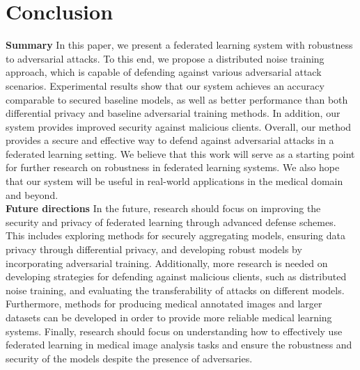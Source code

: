 \section{Conclusion }
\textbf{Summary }
In this paper, we present a federated learning system with robustness to adversarial attacks. To this end, we propose a distributed noise training approach, which is capable of defending against various adversarial attack scenarios. Experimental results show that our system achieves an accuracy comparable to secured baseline models, as well as better performance than both differential privacy and baseline adversarial training methods. In addition, our system provides improved security against malicious clients. Overall, our method provides a secure and effective way to defend against adversarial attacks in a federated learning setting. We believe that this work will serve as a starting point for further research on robustness in federated learning systems. We also hope that our system will be useful in real-world applications in the medical domain and beyond.
\\\textbf{Future directions}
In the future, research should focus on improving the security and privacy of federated learning through advanced defense schemes. This includes exploring methods for securely aggregating models, ensuring data privacy through differential privacy, and developing robust models by incorporating adversarial training. Additionally, more research is needed on developing strategies for defending against malicious clients, such as distributed noise training, and evaluating the transferability of attacks on different models. 
 Furthermore, methods for producing medical annotated images and larger datasets can be developed in order to provide more reliable medical learning systems. Finally, research should focus on understanding how to effectively use federated learning in medical image analysis tasks and ensure the robustness and security of the models despite the presence of adversaries.

